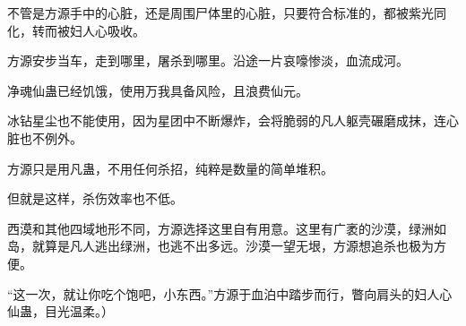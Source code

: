\begin{this_body}
不管是方源手中的心脏，还是周围尸体里的心脏，只要符合标准的，都被紫光同化，转而被妇人心吸收。

方源安步当车，走到哪里，屠杀到哪里。沿途一片哀嚎惨淡，血流成河。

净魂仙蛊已经饥饿，使用万我具备风险，且浪费仙元。

冰钻星尘也不能使用，因为星团中不断爆炸，会将脆弱的凡人躯壳碾磨成抹，连心脏也不例外。

方源只是用凡蛊，不用任何杀招，纯粹是数量的简单堆积。

但就是这样，杀伤效率也不低。

西漠和其他四域地形不同，方源选择这里自有用意。这里有广袤的沙漠，绿洲如岛，就算是凡人逃出绿洲，也逃不出多远。沙漠一望无垠，方源想追杀也极为方便。

“这一次，就让你吃个饱吧，小东西。”方源于血泊中踏步而行，瞥向肩头的妇人心仙蛊，目光温柔。）

\end{this_body}

